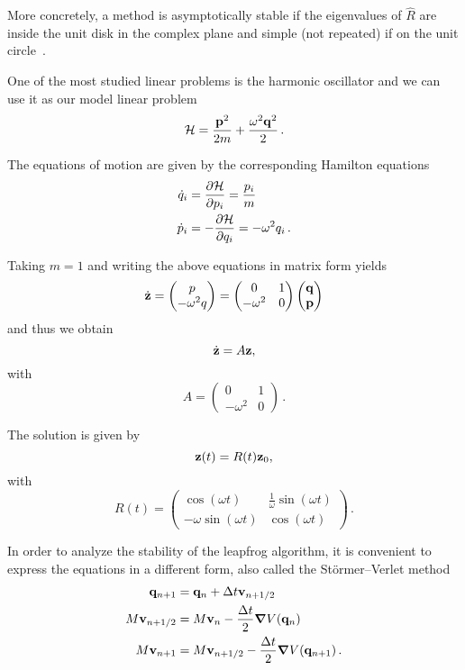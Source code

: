 \documentclass[12pt, class=report, crop=false]{standalone}
\begin{document}
More concretely, a method is asymptotically stable if the eigenvalues of
\(\hat{R}\) are inside the unit disk in the complex plane and simple (not repeated)
if on the unit circle~\autocite[28]{leimkuhler_simulatinghamiltonian_2004}.

One of the most studied linear problems is the harmonic oscillator and we can use
it as our model linear problem
\[
\mathcal{H} = \frac{\vb{p}^2}{2m} + \frac{\omega^2 \vb{q}^2}{2}\,.
\]

The equations of motion are given by the corresponding Hamilton equations
\begin{align*}
  \dot{q}_i &= \pdv{\mathcal{H}}{p_i} = \frac{p_i}{m} \\
  \dot{p}_i &= -\pdv{\mathcal{H}}{q_i} = -\omega^2 q_i\,.
\end{align*}

Taking \(m=1\) and writing the above equations in matrix form yields
\[
\dot{\vb{z}} =
\begin{pmatrix}
  p \\
  -\omega^2 q
\end{pmatrix} =
\begin{pmatrix}
  0 & 1 \\
  -\omega^2 & 0
\end{pmatrix}
\begin{pmatrix}
  \vb{q} \\
  \vb{p}
\end{pmatrix}
\]
and thus we obtain
\[
\dot{\vb{z}} = A \vb{z},
\]
with
\[
A =
\begin{pmatrix}
  0 & 1 \\
  -\omega^2 & 0
\end{pmatrix}\,.
\]

The solution is given by
\[
\vb{z}(t) = R(t) \vb{z}_0,
\]
with
\[
R(t) =
\begin{pmatrix}
  \cos(\omega t) & \frac{1}{\omega} \sin(\omega t) \\
  -\omega \sin(\omega t) & \cos(\omega t)
\end{pmatrix}\,.
\]

In order to analyze the stability of the leapfrog algorithm, it is convenient to
express the equations in a different form, also called the Störmer–Verlet method
\begin{align*}
  \vb{q}_{n+1} &= \vb{q}_n + \Delta t \vb{v}_{n+1/2} \\
  M \vb{v}_{n+1/2} &= M \vb{v}_n - \frac{\Delta t}{2} \grad{V(\vb{q}_n)} \\
  M \vb{v}_{n+1} &= M \vb{v}_{n+1/2} - \frac{\Delta t}{2} \grad{V(\vb{q}_{n+1})}\,.
\end{align*}
\end{document}
